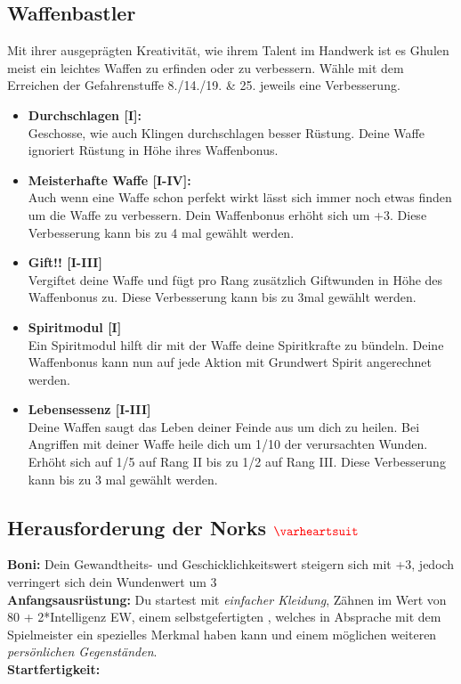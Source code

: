 \subsection*{Waffenbastler} \label{sk:waffenbastler}
Mit ihrer ausgeprägten Kreativität, wie ihrem Talent im Handwerk ist es Ghulen meist ein leichtes Waffen zu erfinden oder zu verbessern. Wähle mit dem Erreichen der Gefahrenstuffe 8./14./19. \& 25. jeweils eine Verbesserung.\\
\begin{itemize}
    \item \textbf{Durchschlagen [I]:} \\
    Geschosse, wie auch Klingen durchschlagen besser Rüstung. Deine Waffe ignoriert Rüstung in Höhe ihres Waffenbonus.
    
    \item \textbf{Meisterhafte Waffe [I-IV]:}\\
    Auch wenn eine Waffe schon perfekt wirkt lässt sich immer noch etwas finden um die Waffe zu verbessern. Dein Waffenbonus erhöht sich um +3. Diese Verbesserung kann bis zu 4 mal gewählt werden.
    
    \item \textbf{Gift!! [I-III]} \\
    Vergiftet deine Waffe und fügt pro Rang zusätzlich Giftwunden in Höhe des Waffenbonus zu. 
    Diese Verbesserung kann bis zu 3mal gewählt werden.
    
    \item \textbf{Spiritmodul [I]} \\
    Ein Spiritmodul hilft dir mit der Waffe deine Spiritkrafte zu bündeln. Deine Waffenbonus kann nun auf jede Aktion mit Grundwert Spirit angerechnet werden. 
    
    \item \textbf{Lebensessenz [I-III]} \\
    Deine Waffen saugt das Leben deiner Feinde aus um dich zu heilen. Bei Angriffen mit deiner Waffe heile dich um 1/10 der verursachten Wunden. Erhöht sich auf 1/5 auf Rang II bis zu 1/2 auf Rang III. Diese Verbesserung kann bis zu 3 mal gewählt werden.  
\end{itemize}

\subsection*{Herausforderung der Norks $\Herz{}$}
\textbf{Boni:} Dein Gewandtheits- und Geschicklichkeitswert steigern sich mit +3, jedoch verringert sich dein Wundenwert um 3 \\
\textbf{Anfangsausrüstung:} Du startest mit \textit{einfacher Kleidung}, Zähnen im Wert von 80 + 2*Intelligenz EW, einem selbstgefertigten , welches in Absprache mit dem Spielmeister ein spezielles Merkmal haben kann und einem möglichen weiteren \textit{persönlichen Gegenständen}. \\
\textbf{Startfertigkeit:} 

